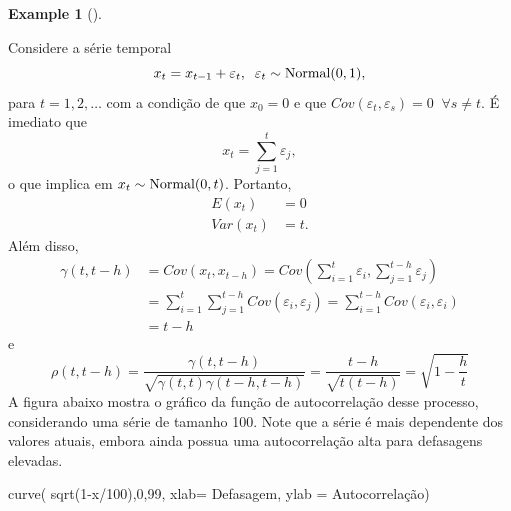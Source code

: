 \documentclass[
  letterpaper,
  DIV=11,
  numbers=noendperiod]{scrartcl}
\newenvironment{Shaded}{\begin{snugshade}}{\end{snugshade}}
\newcommand{\AttributeTok}[1]{\textcolor[rgb]{0.40,0.45,0.13}{#1}}
\newcommand{\DecValTok}[1]{\textcolor[rgb]{0.68,0.00,0.00}{#1}}
\newcommand{\FunctionTok}[1]{\textcolor[rgb]{0.28,0.35,0.67}{#1}}
\newcommand{\NormalTok}[1]{\textcolor[rgb]{0.00,0.23,0.31}{#1}}
\newcommand{\SpecialCharTok}[1]{\textcolor[rgb]{0.37,0.37,0.37}{#1}}
\newcommand{\StringTok}[1]{\textcolor[rgb]{0.13,0.47,0.30}{#1}}
\theoremstyle{definition}
\newtheorem{example}{Example}[chapter]
\theoremstyle{definition}
\theoremstyle{plain}
\theoremstyle{plain}
\theoremstyle{remark}
\begin{document}
\begin{example}[]\protect\hypertarget{exm-acf1}{}\label{exm-acf1}

Considere a série temporal
\[x_t= x_{t-1}+\varepsilon_t,\;\;\varepsilon_t\sim\hbox{Normal}(0,1),\]
para \(t=1,2,\ldots\) com a condição de que \(x_0=0\) e que
\(Cov(\varepsilon_t,\varepsilon_s)=0\;\;\forall s\neq t\). É imediato
que \begin{equation}
    x_{t}=\sum_{j=1}^{t}\varepsilon_{j},
    \end{equation} o que implica em \(x_t\sim\hbox{Normal}(0,t)\).
Portanto, \begin{align}
        E(x_t)&=0\\
        Var(x_t)&=t.
        \end{align} Além disso, \begin{align*}
    \gamma(t,t-h)&=Cov(x_t,x_{t-h})=Cov\left(\sum_{i=1}^{t}\varepsilon_{i},\sum_{j=1}^{t-h}\varepsilon_{j}\right)\\
    &=\sum_{i=1}^{t}\sum_{j=1}^{t-h}Cov\left(\varepsilon_{i},\varepsilon_{j}\right)=\sum_{i=1}^{t-h}Cov(\varepsilon_i,\varepsilon_i)\\
    &=t-h
    \end{align*} e \begin{equation}
    \rho(t,t-h)=\frac{\gamma(t,t-h)}{\sqrt{\gamma(t,t)\gamma(t-h,t-h)}}=\frac{t-h}{\sqrt{t(t-h)}}=\sqrt{1-\frac{h}{t}}
    \end{equation} A figura abaixo mostra o gráfico da função de
autocorrelação desse processo, considerando uma série de tamanho 100.
Note que a série é mais dependente dos valores atuais, embora ainda
possua uma autocorrelação alta para defasagens elevadas.

\begin{Shaded}
\begin{Highlighting}[]
\FunctionTok{curve}\NormalTok{( }\FunctionTok{sqrt}\NormalTok{(}\DecValTok{1}\SpecialCharTok{{-}}\NormalTok{x}\SpecialCharTok{/}\DecValTok{100}\NormalTok{),}\DecValTok{0}\NormalTok{,}\DecValTok{99}\NormalTok{, }\AttributeTok{xlab=} \StringTok{\textquotesingle{}Defasagem\textquotesingle{}}\NormalTok{, }\AttributeTok{ylab =} \StringTok{\textquotesingle{}Autocorrelação\textquotesingle{}}\NormalTok{)}
\end{Highlighting}
\end{Shaded}

\begin{figure}

\begin{minipage}[t]{\linewidth}


\end{minipage}
\end{figure}
\end{example}
\end{document}
